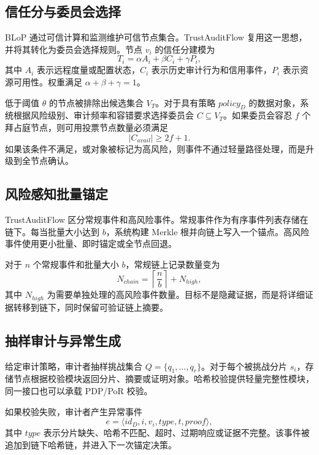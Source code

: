 \subsection{信任分与委员会选择}

BLoP 通过可信计算和监测维护可信节点集合。TrustAuditFlow 复用这一思想，并将其转化为委员会选择规则。节点 $v_i$ 的信任分建模为
\begin{equation}
  T_i = \alpha A_i + \beta C_i + \gamma P_i,
\end{equation}
其中 $A_i$ 表示远程度量或配置状态，$C_i$ 表示历史审计行为和信用事件，$P_i$ 表示资源可用性。权重满足 $\alpha+\beta+\gamma=1$。

低于阈值 $\theta$ 的节点被排除出候选集合 $V_T$。对于具有策略 $policy_D$ 的数据对象，系统根据风险级别、审计频率和容错要求选择委员会 $C \subseteq V_T$。如果委员会容忍 $f$ 个拜占庭节点，则可用投票节点数量必须满足
\begin{equation}
  |C_{avail}| \geq 2f+1.
\end{equation}
如果该条件不满足，或对象被标记为高风险，则事件不通过轻量路径处理，而是升级到全节点确认。

\subsection{风险感知批量锚定}

TrustAuditFlow 区分常规事件和高风险事件。常规事件作为有序事件列表存储在链下。每当批量大小达到 $b$，系统构建 Merkle 根并向链上写入一个锚点。高风险事件使用更小批量、即时锚定或全节点回退。

对于 $n$ 个常规事件和批量大小 $b$，常规链上记录数量变为
\begin{equation}
  N_{chain} = \left\lceil \frac{n}{b} \right\rceil + N_{high},
\end{equation}
其中 $N_{high}$ 为需要单独处理的高风险事件数量。目标不是隐藏证据，而是将详细证据转移到链下，同时保留可验证链上摘要。

\subsection{抽样审计与异常生成}

给定审计策略，审计者抽样挑战集合 $Q=\{q_1,\ldots,q_r\}$。对于每个被挑战分片 $s_i$，存储节点根据校验模块返回分片、摘要或证明对象。哈希校验提供轻量完整性模块，同一接口也可以承载 PDP/PoR 校验。

如果校验失败，审计者产生异常事件
\begin{equation}
  e = \langle id_D, i, v_i, type, t, proof \rangle,
\end{equation}
其中 $type$ 表示分片缺失、哈希不匹配、超时、过期响应或证据不完整。该事件被追加到链下哈希链，并进入下一次锚定决策。

